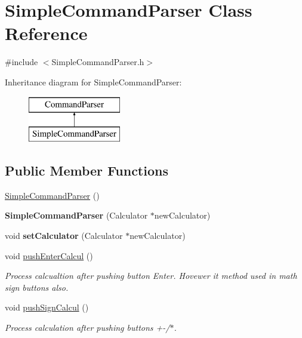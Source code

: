 \hypertarget{class_simple_command_parser}{}\section{Simple\+Command\+Parser Class Reference}
\label{class_simple_command_parser}


{\ttfamily \#include $<$Simple\+Command\+Parser.\+h$>$}

Inheritance diagram for Simple\+Command\+Parser\+:\begin{figure}[H]
\begin{center}
\leavevmode
\includegraphics[height=2.000000cm]{class_simple_command_parser}
\end{center}
\end{figure}
\subsection*{Public Member Functions}
\begin{DoxyCompactItemize}
\item 
\hyperlink{class_simple_command_parser_a36f481c3b38076dd51af0b3b21dfc799}{Simple\+Command\+Parser} ()
\item 
\hypertarget{class_simple_command_parser_a62668b9abee69fbbe2abf7e46858691a}{}{\bfseries Simple\+Command\+Parser} (Calculator $\ast$new\+Calculator)\label{class_simple_command_parser_a62668b9abee69fbbe2abf7e46858691a}

\item 
\hypertarget{class_simple_command_parser_a759779af9ad397dcd267b2ac43a43509}{}void {\bfseries set\+Calculator} (Calculator $\ast$new\+Calculator)\label{class_simple_command_parser_a759779af9ad397dcd267b2ac43a43509}

\item 
\hypertarget{class_simple_command_parser_a029433f8b08defadd23ea777b1d7018a}{}void \hyperlink{class_simple_command_parser_a029433f8b08defadd23ea777b1d7018a}{push\+Enter\+Calcul} ()\label{class_simple_command_parser_a029433f8b08defadd23ea777b1d7018a}

\begin{DoxyCompactList}\small\item\em Process calcualtion after pushing button Enter. Hovewer it method used in math sign buttons also. \end{DoxyCompactList}\item 
\hypertarget{class_simple_command_parser_a3cd15cf8330f7da84256e0d5af5055bc}{}void \hyperlink{class_simple_command_parser_a3cd15cf8330f7da84256e0d5af5055bc}{push\+Sign\+Calcul} ()\label{class_simple_command_parser_a3cd15cf8330f7da84256e0d5af5055bc}

\begin{DoxyCompactList}\small\item\em Process calculation after pushing buttons +-\//$\ast$. \end{DoxyCompactList}\end{DoxyCompactItemize}

